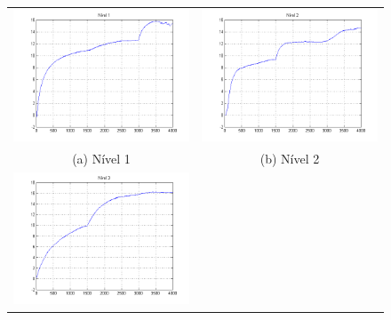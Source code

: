 \begin{figure}[H]
	\centering
	\begin{tabular}{cc}
		\includegraphics[height=0.2\paperheight,keepaspectratio]{img/sim1_h1.png} &
		\includegraphics[height=0.2\paperheight,keepaspectratio]{img/sim1_h2.png} \\
		(a) Nível 1 &
		(b) Nível 2 \\
		\includegraphics[height=0.2\paperheight,keepaspectratio]{img/sim1_h3.png} &

\end{tabular}
\end{figure}

